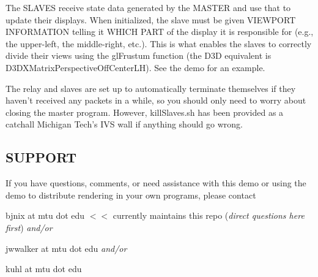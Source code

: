 \begin{DoxyItemize}
\item The S\+L\+A\+V\+E\+S receive state data generated by the M\+A\+S\+T\+E\+R and use that to update their displays. When initialized, the slave must be given V\+I\+E\+W\+P\+O\+R\+T I\+N\+F\+O\+R\+M\+A\+T\+I\+O\+N telling it W\+H\+I\+C\+H P\+A\+R\+T of the display it is responsible for (e.\+g., the upper-\/left, the middle-\/right, etc.). This is what enables the slaves to correctly divide their views using the gl\+Frustum function (the D3\+D equivalent is D3\+D\+X\+Matrix\+Perspective\+Off\+Center\+L\+H). See the demo for an example.
\item The relay and slaves are set up to automatically terminate themselves if they haven't received any packets in a while, so you should only need to worry about closing the master program. However, kill\+Slaves.\+sh has been provided as a catchall Michigan Tech's I\+V\+S wall if anything should go wrong.
\end{DoxyItemize}

\subsection*{S\+U\+P\+P\+O\+R\+T }

If you have questions, comments, or need assistance with this demo or using the demo to distribute rendering in your own programs, please contact


\begin{DoxyItemize}
\item bjnix at mtu dot edu $<$$<$ currently maintains this repo ({\itshape direct questions here first}) {\itshape and/or}
\item jwwalker at mtu dot edu {\itshape and/or}
\item kuhl at mtu dot edu 
\end{DoxyItemize}